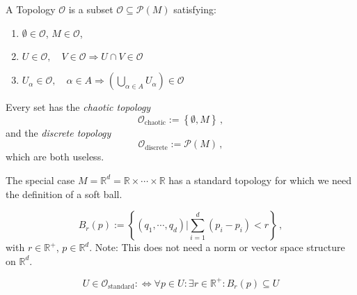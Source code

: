 \documentclass[11pt, a4paper, twocolumn]{article} %
\begin{document}
\begin{defn}[Topology]
    A Topology $\mathcal{O}$ is a subset $\mathcal{O} \subseteq \mathcal{P}(M)$ satisfying:
    \begin{enumerate}
        \item $\emptyset \in \mathcal{O}$, $M\in\mathcal{O}$,
        \item $U\in\mathcal{O},\quad V\in\mathcal{O}\Rightarrow U\cap V\in\mathcal{O}$
        \item $U_\alpha\in\mathcal{O},\quad \alpha\in A \Rightarrow
            \left( \bigcup\limits_{\alpha\in A} U_\alpha \right) \in \mathcal{O}$
    \end{enumerate}
\end{defn}
Every set has the \textit{chaotic topology}
\begin{equation}
    \mathcal{O}_\text{chaotic} := \left\{ \emptyset, M \right\}\,,
\end{equation}
and the \textit{discrete topology}
\begin{equation}
    \mathcal{O}_\text{discrete} := \mathcal{P}(M)\,,
\end{equation}
which are both useless.

The special case $M = \mathbb{R}^d = \mathbb{R} \times \cdots \times \mathbb{R}$ has a standard topology
for which we need the definition of a soft ball.
\begin{defn}
   \begin{equation}
       B_r(p) := \left\{ (q_1,\cdots,q_d)| \sum_{i=1}^{d}(p_i-p_i) < r \right\}\,,
   \end{equation} 
   with $r\in \mathbb{R}^+$, $p\in\mathbb{R}^d$.
   Note: This does not need a norm or vector space structure on $\mathbb{R}^d$.
\end{defn}
\begin{defn}
    \begin{equation}
        U \in \mathcal{O}_\text{standard} :\Leftrightarrow \forall p\in U:
        \exists r\in\mathbb{R}^+ : B_r(p) \subseteq U
    \end{equation}
\end{defn}
\end{document}

